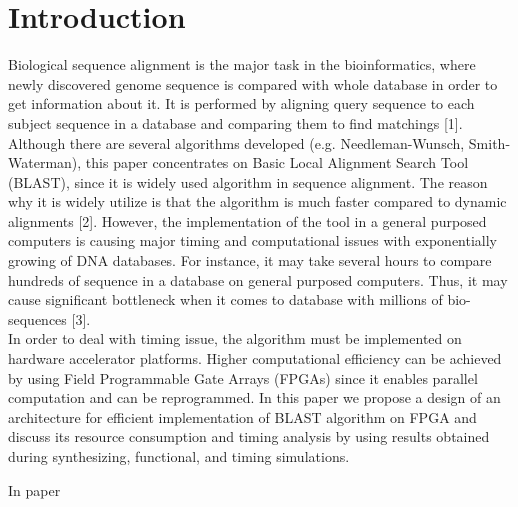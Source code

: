 \section{Introduction}
\label{sec:introduction}

Biological sequence alignment is the major task in the bioinformatics, where newly discovered genome sequence is compared with whole database in order to get information about it. It is performed by aligning query sequence to each subject sequence in a database and comparing them to find matchings [1].
\\
Although there are several algorithms developed (e.g. Needleman-Wunsch, Smith-Waterman), this paper concentrates on Basic Local Alignment Search Tool (BLAST), since it is widely used algorithm in sequence alignment. The reason why it is widely utilize is that the algorithm is much faster compared to dynamic alignments [2]. However, the implementation of the tool in a general purposed computers is causing major timing and computational issues with exponentially growing of DNA databases. For instance, it may take several hours to compare hundreds of sequence in a database on general purposed computers. Thus, it may cause significant bottleneck when it comes to database with millions of bio-sequences [3].
\\
In order to deal with timing issue, the algorithm must be implemented on hardware accelerator platforms. Higher computational efficiency can be achieved by using Field Programmable Gate Arrays (FPGAs) since it enables parallel computation and can be reprogrammed. In this paper we propose a design of an architecture for efficient implementation of BLAST algorithm on FPGA and discuss its resource consumption and timing analysis by using results obtained during synthesizing, functional, and timing simulations. 

In paper \cite{vipin2019}

